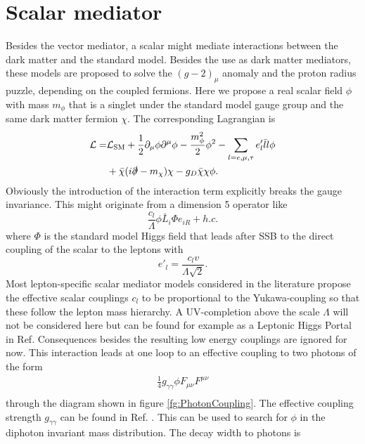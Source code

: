 \section{Scalar mediator}
Besides the vector mediator, a scalar might mediate interactions between the dark matter and the standard model. Besides the use as dark matter mediators, these models are proposed to solve the $(g-2)_\mu$ anomaly and the proton radius puzzle, depending on the coupled fermions. 
Here we propose a real scalar field $\phi$ with mass $m_\phi$ that is a singlet under the standard model gauge group and the same dark matter fermion $\chi$. The corresponding Lagrangian is 
\begin{align*}
\mathcal{L}=& \mathcal{L}_\text{SM}+\frac{1}{2}\partial_\mu \phi \partial^\mu \phi-\frac{m_{\phi}^2}{2}\phi^2 -\sum_{l=e,\mu,\tau} e'_l\bar{l} l \phi \\&+\bar{\chi}(i\slashed{\partial}-m_\chi)\chi -g_D\bar{\chi}\chi\phi.
\end{align*}
Obviously the introduction of the interaction term explicitly breaks the gauge invariance.
This might originate from a dimension 5 operator like 
\begin{equation}
\frac{c_l}{\Lambda}\phi \bar{L}_i\Phi e_{iR}+h.c.
\end{equation} 
where $\Phi$ is the standard model Higgs field that leads after SSB to the direct coupling of the scalar to the leptons with 
\begin{equation}
e'_l=\frac{c_l v}{\Lambda\sqrt{2}}.
\end{equation}
Most lepton-specific scalar mediator models considered in the literature propose the effective scalar couplings $c_l$ to be proportional to the Yukawa-coupling so that these follow the lepton mass hierarchy. 
A UV-completion above the scale $\Lambda$ will not be considered here but can be found for example as a Leptonic Higgs Portal in Ref\cite{Batell:2016ove}. Consequences besides the resulting low energy couplings are ignored for now.
This interaction leads  at one loop to an effective coupling to two photons of the form 
\begin{align*}
\frac{1}{4}g_{\gamma\gamma} \phi F_{\mu\nu} F^{\mu\nu}\\
\end{align*}
through the diagram shown in figure \ref{fg:PhotonCoupling}. The effective coupling strength $g_{\gamma\gamma}$ can be found in Ref. \cite{Chen:2018vkr}. This can be used to search for $\phi$ in the diphoton invariant mass distribution. 
The decay width to photons is
